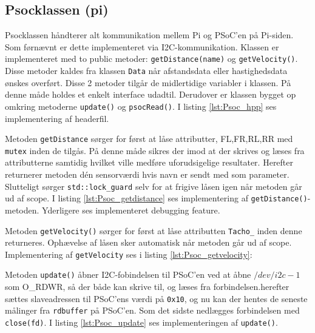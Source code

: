 \subsection{Psocklassen (pi)}

Psocklassen håndterer alt kommunikation mellem Pi og PSoC'en på Pi-siden. Som førnævnt er dette implementeret via I2C-kommunikation. Klassen er implementeret med to public metoder: \texttt{getDistance(name)} og \texttt{getVelocity()}. Disse metoder kaldes fra klassen \texttt{Data} når afstandsdata eller hastighedsdata ønskes overført. Disse 2 metoder tilgår de midlertidige variabler i klassen. På denne måde holdes et enkelt interface udadtil. Derudover er klassen bygget op omkring metoderne \texttt{update()} og \texttt{psocRead()}. I listing \ref{lst:Psoc_hpp} ses implementering af headerfil.

 

\clearpage

Metoden \texttt{getDistance} sørger for først at låse attributter, FL,FR,RL,RR med \texttt{mutex} inden de tilgås. På denne måde sikres der imod at der skrives og læses fra attributterne samtidig hvilket ville medføre uforudsigelige resultater. Herefter returnerer metoden dén sensorværdi hvis navn er sendt med som parameter. Slutteligt sørger \texttt{std::lock\_guard} selv for at frigive låsen igen når metoden går ud af scope. I listing \ref{lst:Psoc_getdistance} ses implementering af \texttt{getDistance()}-metoden. Yderligere ses implementeret debugging feature. 



\clearpage

Metoden \texttt{getVelocity()} sørger for først at låse attributten \texttt{Tacho\_} inden denne returneres. Ophævelse af låsen sker automatisk når metoden går ud af scope. Implementering af \texttt{getVelocity} ses i listing \ref{lst:Psoc_getvelocity}: 



\clearpage

Metoden \texttt{update()} åbner I2C-fobindelsen til PSoC'en ved at åbne $/dev/i2c-1$ som O\_RDWR, så der både kan skrive til, og læses fra forbindelsen.herefter sættes slaveadressen til PSoC'ens værdi på \texttt{0x10}, og nu kan der hentes de seneste målinger fra \texttt{rdbuffer} på PSoC'en. Som det sidste nedlægges forbindelsen med \texttt{close(fd)}. I listing \ref{lst:Psoc_update} ses implementeringen af \texttt{update()}. 

